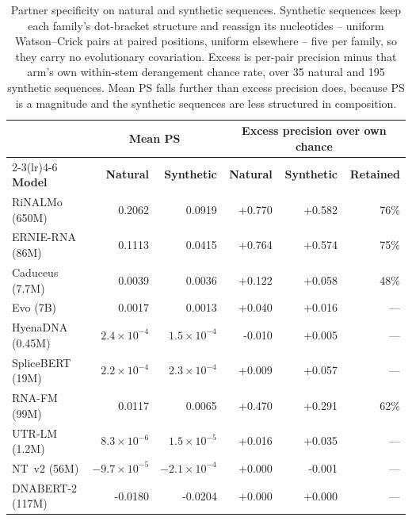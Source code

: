 \begin{table}[htbp]
\centering
\caption{Partner specificity on natural and synthetic sequences. Synthetic sequences keep each family's dot-bracket structure and reassign its nucleotides -- uniform Watson--Crick pairs at paired positions, uniform elsewhere -- five per family, so they carry no evolutionary covariation. Excess is per-pair precision minus that arm's own within-stem derangement chance rate, over 35 natural and 195 synthetic sequences. Mean PS falls further than excess precision does, because PS is a magnitude and the synthetic sequences are less structured in composition.}
\label{tab:synthetic}
\small
\begin{tabular}{@{}lrrrrr@{}}
\toprule
 & \multicolumn{2}{c}{\textbf{Mean PS}} & \multicolumn{3}{c}{\textbf{Excess precision over own chance}} \\
\cmidrule(lr){2-3}\cmidrule(lr){4-6}
\textbf{Model} & \textbf{Natural} & \textbf{Synthetic} & \textbf{Natural} & \textbf{Synthetic} & \textbf{Retained} \\
\midrule
RiNALMo (650M) & 0.2062 & 0.0919 & +0.770 & +0.582 & 76\% \\
ERNIE-RNA (86M) & 0.1113 & 0.0415 & +0.764 & +0.574 & 75\% \\
Caduceus (7.7M) & 0.0039 & 0.0036 & +0.122 & +0.058 & 48\% \\
Evo (7B) & 0.0017 & 0.0013 & +0.040 & +0.016 & --- \\
HyenaDNA (0.45M) & $2.4 \times 10^{-4}$ & $1.5 \times 10^{-4}$ & -0.010 & +0.005 & --- \\
SpliceBERT (19M) & $2.2 \times 10^{-4}$ & $2.3 \times 10^{-4}$ & +0.009 & +0.057 & --- \\
RNA-FM (99M) & 0.0117 & 0.0065 & +0.470 & +0.291 & 62\% \\
UTR-LM (1.2M) & $8.3 \times 10^{-6}$ & $1.5 \times 10^{-5}$ & +0.016 & +0.035 & --- \\
NT~v2 (56M) & $-9.7 \times 10^{-5}$ & $-2.1 \times 10^{-4}$ & +0.000 & -0.001 & --- \\
DNABERT-2 (117M) & -0.0180 & -0.0204 & +0.000 & +0.000 & --- \\
\bottomrule
\end{tabular}
\end{table}
